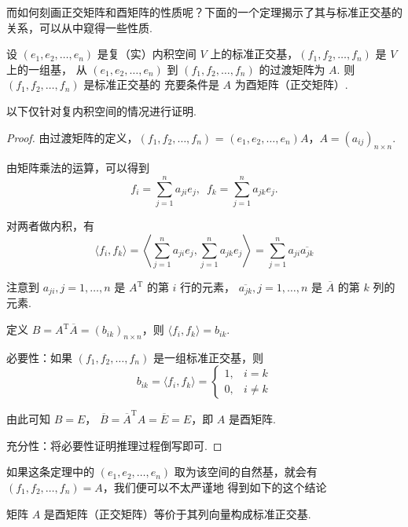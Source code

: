 而如何刻画正交矩阵和酉矩阵的性质呢？下面的一个定理揭示了其与标准正交基的关系，可以从中窥得一些性质.  

\begin{theorem}
    设 $ (e_1, e_2, \ldots , e_n) $ 是复（实）内积空间 $ V $ 上的标准正交基，$ (f_1, f_2, \ldots , f_n) $ 是 $ V $ 上的一组基，
    从 $ (e_1, e_2, \ldots , e_n) $ 到 $ (f_1, f_2, \ldots , f_n) $ 的过渡矩阵为 $ A $. 则 $ (f_1, f_2, \ldots , f_n) $ 是标准正交基的
    充要条件是 $ A $ 为酉矩阵（正交矩阵）. 
\end{theorem}

以下仅针对复内积空间的情况进行证明. 

\begin{proof}
    由过渡矩阵的定义，$ (f_1, f_2, \ldots , f_n) $ = $ (e_1, e_2, \ldots , e_n)A $，$ A = (a_{ij})_{n \times n} $. 

    由矩阵乘法的运算，可以得到
    \[ f_i = \sum_{j = 1}^{n} a_{ji}e_j , \enspace f_k = \sum_{j = 1}^{n} a_{jk}e_j. \]

    对两者做内积，有
    \[
    \langle f_i, f_k \rangle = \left\langle \sum_{j = 1}^{n} a_{ji}e_j, \sum_{j = 1}^{n} a_{jk}e_j \right\rangle
    = \sum_{j = 1}^{n} a_{ji}\overline{a_{jk}} 
    \]

    注意到 $ a_{ji}, j = 1, \ldots , n $ 是 $ A^{\mathrm{T}} $ 的第 $ i $ 行的元素，
    $ \overline{a_{jk}}, j = 1, \ldots , n $ 是 $ \overline{A} $ 的第 $ k $ 列的元素.
   
    定义 $ B = A^{\mathrm{T}}\overline{A} = (b_{ik})_{n \times n} $，则 $ \langle f_i, f_k \rangle = b_{ik} $. 

    必要性：如果 $ (f_1, f_2, \ldots , f_n) $ 是一组标准正交基，则
    \[
        b_{ik} = \langle f_i, f_k \rangle = 
        \begin{cases}
            1, & i = k \\
            0, & i \neq k 
        \end{cases}    
    \]

    由此可知 $ B = E $， $ \overline{B} = \overline{A}^{\mathrm{T}} A = \overline{E} = E $，即 $ A $ 是酉矩阵. 
    
    充分性：将必要性证明推理过程倒写即可. 

\end{proof}

如果这条定理中的 $ (e_1, e_2, \ldots , e_n) $ 取为该空间的自然基，就会有 $ (f_1, f_2, \ldots , f_n) = A $，我们便可以不太严谨地
得到如下的这个结论

\begin{theorem}
    矩阵 $ A $ 是酉矩阵（正交矩阵）等价于其列向量构成标准正交基. 
\end{theorem}


